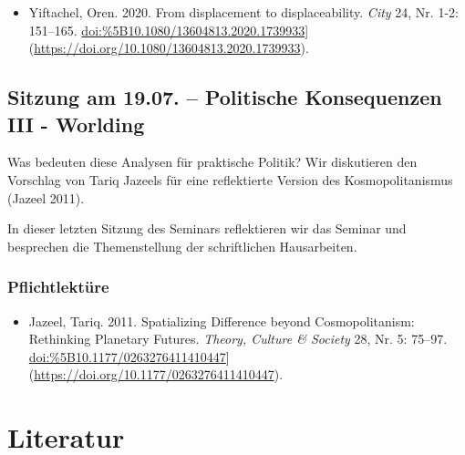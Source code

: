 \documentclass[
]{article}
\providecommand{\tightlist}{%
  \setlength{\itemsep}{0pt}\setlength{\parskip}{0pt}}
\begin{document}
\begin{itemize}
\tightlist
\item
  Yiftachel, Oren. 2020. From displacement to displaceability. \emph{City} 24, Nr. 1-2: 151--165. \url{doi:\%5B10.1080/13604813.2020.1739933}{]}(\url{https://doi.org/10.1080/13604813.2020.1739933}).
\end{itemize}

\hypertarget{sitzung-am-19.07.-politische-konsequenzen-iii---worlding}{%
\subsection{Sitzung am 19.07. -- Politische Konsequenzen III - Worlding}\label{sitzung-am-19.07.-politische-konsequenzen-iii---worlding}}

Was bedeuten diese Analysen für praktische Politik? Wir diskutieren den Vorschlag von Tariq Jazeels für eine reflektierte Version des Kosmopolitanismus (Jazeel 2011).

In dieser letzten Sitzung des Seminars reflektieren wir das Seminar und besprechen die Themenstellung der schriftlichen Hausarbeiten.

\hypertarget{pflichtlektuxfcre-12}{%
\subsubsection*{Pflichtlektüre}\label{pflichtlektuxfcre-12}}

\begin{itemize}
\tightlist
\item
  Jazeel, Tariq. 2011. Spatializing Difference beyond Cosmopolitanism: Rethinking Planetary Futures. \emph{Theory, Culture \& Society} 28, Nr. 5: 75--97. \url{doi:\%5B10.1177/0263276411410447}{]}(\url{https://doi.org/10.1177/0263276411410447}).
\end{itemize}

\pagebreak

\hypertarget{literatur}{%
\section*{Literatur}\label{literatur}}
\end{document}
